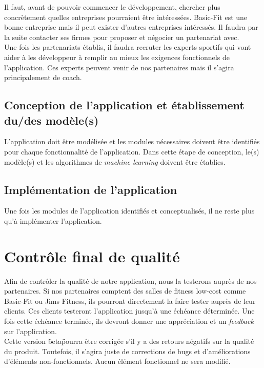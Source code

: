 Il faut, avant de pouvoir commencer le développement, chercher plus concrètement quelles entreprises pourraient être intéressées. Basic-Fit est une bonne entreprise mais il peut exister d'autres entreprises intéressés. Il faudra par la suite contacter ses firmes pour proposer et négocier un partenariat avec.\\
Une fois les partenariats établis, il faudra recruter les experts sportifs qui vont aider à les développeur à remplir au mieux les exigences fonctionnels de l'application. Ces experts peuvent venir de nos partenaires mais il s'agira principalement de coach. 

\subsection*{Conception de l'application et établissement du/des modèle(s)}

L'application doit être modélisée et les modules nécessaires doivent être identifiés pour chaque fonctionnalité de l'application. Dans cette étape de conception, le(s) modèle(s) et les algorithmes de \textit{machine learning} doivent être établies. 

\subsection*{Implémentation de l'application}

Une fois les modules de l'application identifiés et conceptualisés, il ne reste plus qu'à implémenter l'application. 

\section{Contrôle final de qualité}

Afin de contrôler la qualité de notre application, nous la testerons auprès de nos partenaires. Si nos partenaires comptent des salles de fitness low-cost comme Basic-Fit ou Jims Fitness, ils pourront directement la faire tester auprès de leur clients. Ces clients testeront l'application jusqu'à une échéance déterminée. Une fois cette échéance terminée, ils devront donner une appréciation et un \textit{feedback} sur l'application.\\

Cette version \"beta\" pourra être corrigée s'il y a des retours négatifs sur la qualité du produit. Toutefois, il s'agira juste de corrections de bugs et d'améliorations d'éléments non-fonctionnels. Aucun élément fonctionnel ne sera modifié. 

